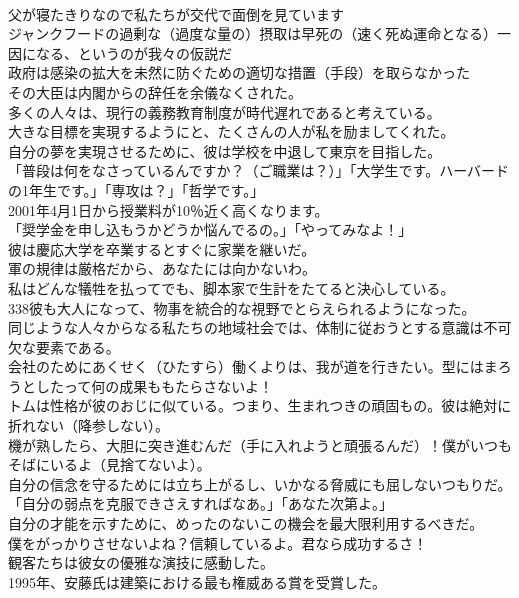 \documentclass[8pt]{extreport}
\begin{document}
\begin{CJK}{UTF8}{min}
\\	父が寝たきりなので私たちが交代で面倒を見ています
\\	ジャンクフードの過剰な（過度な量の）摂取は早死の（速く死ぬ運命となる）一因になる、というのが我々の仮説だ
\\	政府は感染の拡大を未然に防ぐための適切な措置（手段）を取らなかった
\\	その大臣は内閣からの辞任を余儀なくされた。
\\	多くの人々は、現行の義務教育制度が時代遅れであると考えている。
\\	大きな目標を実現するようにと、たくさんの人が私を励ましてくれた。
\\	自分の夢を実現させるために、彼は学校を中退して東京を目指した。
\\	「普段は何をなさっているんですか？（ご職業は？）」「大学生です。ハーバードの1年生です。」「専攻は？」「哲学です。」
\\	2001年4月1日から授業料が10％近く高くなります。
\\	「奨学金を申し込もうかどうか悩んでるの。」「やってみなよ！」
\\	彼は慶応大学を卒業するとすぐに家業を継いだ。
\\	軍の規律は厳格だから、あなたには向かないわ。
\\	私はどんな犠牲を払ってでも、脚本家で生計をたてると決心している。
\\	338彼も大人になって、物事を統合的な視野でとらえられるようになった。
\\	同じような人々からなる私たちの地域社会では、体制に従おうとする意識は不可欠な要素である。
\\	会社のためにあくせく（ひたすら）働くよりは、我が道を行きたい。型にはまろうとしたって何の成果ももたらさないよ！
\\	トムは性格が彼のおじに似ている。つまり、生まれつきの頑固もの。彼は絶対に折れない（降参しない）。
\\	機が熟したら、大胆に突き進むんだ（手に入れようと頑張るんだ）！僕がいつもそばにいるよ（見捨てないよ）。
\\	自分の信念を守るためには立ち上がるし、いかなる脅威にも屈しないつもりだ。
\\	「自分の弱点を克服できさえすればなあ。」「あなた次第よ。」
\\	自分の才能を示すために、めったのないこの機会を最大限利用するべきだ。
\\	僕をがっかりさせないよね？信頼しているよ。君なら成功するさ！
\\	観客たちは彼女の優雅な演技に感動した。
\\	1995年、安藤氏は建築における最も権威ある賞を受賞した。

\end{CJK}
\end{document}
